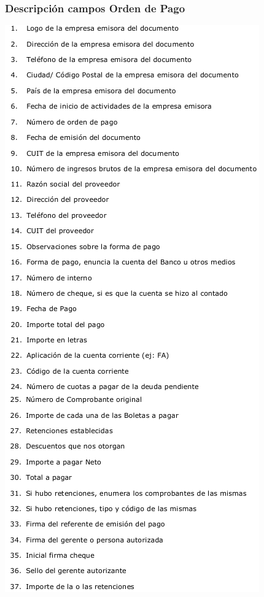 \subsubsection{Descripción campos Orden de Pago}
\begin{center}
 \includegraphics[keepaspectratio=true]{./Circuitos-Teoricos/Pago-a-Proveedores/Images/descripcion-orden-de-pago.png}
\end{center}


